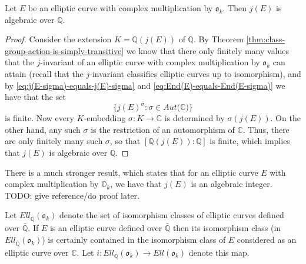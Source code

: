 \begin{prop}
  \label{prop:j(E)-is-in-Qbar}
  Let $E$ be an elliptic curve with complex multiplication by $\mathfrak{o}_{k}$.
  Then $j(E)$ is algebraic over $\mathbb{Q}$.
\end{prop}
\begin{proof}
  Consider the extension $K = \mathbb{Q}(j(E))$ of $\mathbb{Q}$.  By Theorem
  \ref{thm:class-group-action-is-simply-transitive} we know that there only finitely
  many values that the $j$-invariant of an elliptic curve with complex multiplication
  by $\mathfrak{o}_{k}$ can attain (recall that the $j$-invariant classifies elliptic
  curves up to isomorphism), and by \eqref{eq:j(E-sigma)-equals-j(E)-sigma} and
  \eqref{eq:End(E)-equals-End(E-sigma)} we have that the set
  \begin{equation*}
    \{ j(E)^{\sigma} : \sigma \in Aut(\mathbb{C)} \}
  \end{equation*}
  is finite.  Now every $K$-embedding $\sigma : K \rightarrow \mathbb{C}$ is
  determined by $\sigma (j(E))$.  On the other hand, any such $\sigma$ is the
  restriction of an automorphism of $\mathbb{C}$.  Thus, there are only finitely many
  such $\sigma$, so that $[\mathbb{Q}(j(E)) : \mathbb{Q}]$ is finite, which implies
  that $j(E)$ is algebraic over $\mathbb{Q}$.
\end{proof}
\begin{rem}
  \label{rem:j(E)-is-integral}
  There is a much stronger result, which states that for an elliptic curve $E$ with
  complex multiplication by $\mathbb{O}_{k}$, we have that $j(E)$ is an algebraic
  integer.
  TODO: give reference/do proof later.
\end{rem}

Let $Ell_{\bar{\mathbb{Q}}}(\mathfrak{o}_{k})$ denote the set of isomorphism classes of
elliptic curves defined over $\bar{\mathbb{Q}}$.  If $E$ is an elliptic curve defined
over $\bar{\mathbb{Q}}$ then its isomorphism class (in
$Ell_{\bar{\mathbb{Q}}}(\mathfrak{o}_{k})$) is certainly contained in the
isomorphism class of $E$ considered as an elliptic curve over $\mathbb{C}$. Let
$i :
Ell_{\bar{\mathbb{Q}}}(\mathfrak{o}_{k}) \rightarrow Ell(\mathfrak{o}_{k})$ denote
this map.

